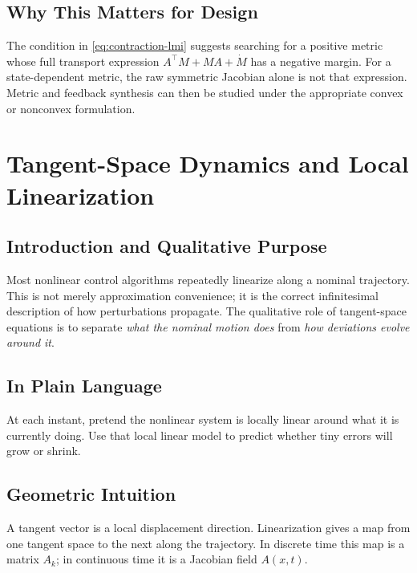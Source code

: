 \documentclass[11pt,letterpaper]{article}
\begin{document}
\subsection{Why This Matters for Design}
The condition in \eqref{eq:contraction-lmi} suggests searching for a positive metric whose full transport expression $A^\top M+MA+\dot M$ has a negative margin. For a state-dependent metric, the raw symmetric Jacobian alone is not that expression. Metric and feedback synthesis can then be studied under the appropriate convex or nonconvex formulation.

\section{Tangent-Space Dynamics and Local Linearization}

\subsection{Introduction and Qualitative Purpose}
Most nonlinear control algorithms repeatedly linearize along a nominal trajectory. This is not merely approximation convenience; it is the correct infinitesimal description of how perturbations propagate. The qualitative role of tangent-space equations is to separate \emph{what the nominal motion does} from \emph{how deviations evolve around it}.

\subsection{In Plain Language}
At each instant, pretend the nonlinear system is locally linear around what it is currently doing. Use that local linear model to predict whether tiny errors will grow or shrink.

\subsection{Geometric Intuition}
A tangent vector is a local displacement direction. Linearization gives a map from one tangent space to the next along the trajectory. In discrete time this map is a matrix $A_k$; in continuous time it is a Jacobian field $A(x,t)$.
\end{document}
